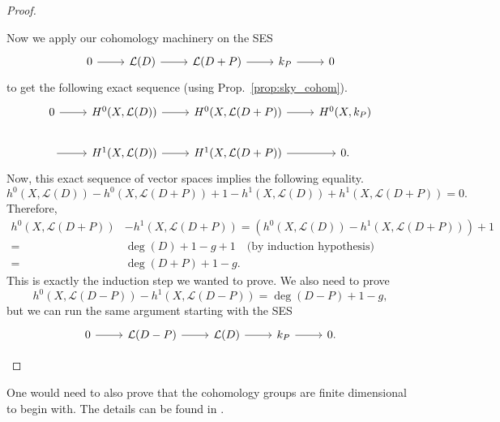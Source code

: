 \begin{proof}
\begin{description}[style=nextline]
          Now we apply our cohomology machinery on the SES
          \[
          \begin{tikzcd}
            0\arrow{r} & \mathcal{L}(D)\arrow{r} & \mathcal{L}(D+P)\arrow{r}
            & k_{P}\arrow{r} & 0
          \end{tikzcd}
          \]
          to get the following exact sequence (using
          Prop.~\ref{prop:sky_cohom}).
          \[
          \begin{tikzcd}
            0\arrow{r} & H^{0}(X, \mathcal{L}(D))\arrow{r}
            & H^{0}(X, \mathcal{L}(D+P))\arrow{r}
            & H^{0}(X, k_{P}) \\
            \arrow{r} & H^{1}(X, \mathcal{L}(D))\arrow{r}
            & H^{1}(X, \mathcal{L}(D+P))\arrow{r} & 0.
          \end{tikzcd}
          \]
          Now, this exact sequence of vector spaces implies the following
          equality.
          \[
          h^{0}(X,\mathcal{L}(D))-h^{0}(X, \mathcal{L}(D+P))
          +1-h^{1}(X,\mathcal{L}(D))+h^{1}(X,\mathcal{L}(D+P)) = 0.
          \]
          Therefore,
          \begin{align*}
            h^{0}(X,\mathcal{L}(D+P))&-h^{1}(X,\mathcal{L}(D+P))
            =\left(h^{0}(X,\mathcal{L}(D))-h^{1}(X,\mathcal{L}(D+P))\right)
              +1 \\
            =&\deg(D)+1-g+1\quad\text{(by induction hypothesis)} \\
            =&\deg(D+P)+1-g.
          \end{align*}
          This is exactly the induction step we wanted to prove.
          We also need to prove
          \[
            h^{0}(X,\mathcal{L}(D-P))-h^{1}(X,\mathcal{L}(D-P))
            =\deg(D-P)+1-g,
          \]
          but we can run the same argument starting with the SES
          \[
          \begin{tikzcd}
            0\arrow{r} & \mathcal{L}(D-P)\arrow{r} & \mathcal{L}(D)\arrow{r}
            & k_{P}\arrow{r} & 0.
          \end{tikzcd}
          \]
  \end{description}
\end{proof}
\begin{lwarn}
  One would need to also prove that the cohomology groups are finite
  dimensional to begin with. The details can be found in \cite{serre}.
\end{lwarn}

